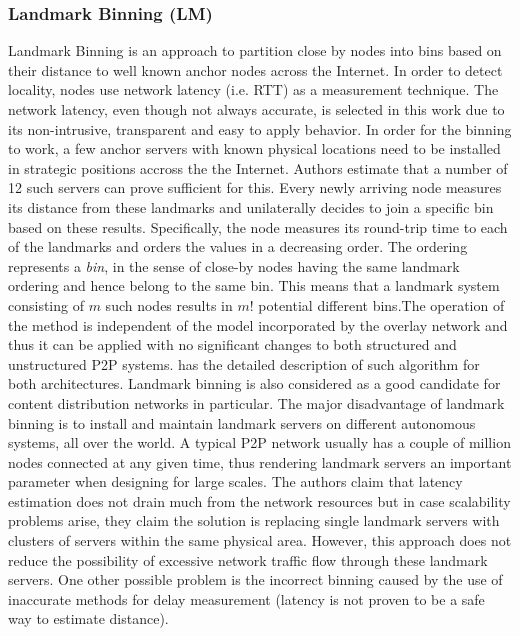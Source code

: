 \subsubsection{Landmark Binning (LM)}\label{sec:landmark_binning}

Landmark Binning \cite{RHMKS2002} is an approach to partition close
by nodes into bins based on their distance to well known anchor nodes across the
Internet.%
In order to detect locality, nodes use network latency (i.e. RTT) as a
measurement technique. The network latency, even though not always accurate, is
selected in this work due to its non-intrusive, transparent and easy to apply
behavior. In order for the binning to work, a few anchor servers with known
physical locations need to be installed in strategic positions accross the the
Internet. Authors estimate that a number of 12 such servers can prove sufficient
for this. Every newly arriving node measures its distance from these landmarks
and unilaterally decides to join a specific bin based on these results.
Specifically, the node measures its round-trip time to each of the landmarks and
orders the values in a decreasing order. The ordering represents a \emph{bin},
in the sense of close-by nodes having the same landmark ordering and hence
belong to the same bin. This means that a landmark system consisting of $m$ such
nodes results in $m!$ potential different bins.The operation of the method is
independent of the model incorporated by the overlay network and thus it can be
applied with no significant changes to both structured and unstructured P2P
systems. \cite{RHMKS2002} has the detailed description of such algorithm for
both architectures. Landmark binning is also considered as a good candidate for
content distribution networks in particular. The major disadvantage of landmark
binning is to install and maintain landmark servers on different autonomous
systems, all over the world. A typical P2P network usually has a couple of
million nodes connected at any given time, thus rendering landmark servers an
important parameter when designing for large scales.  The authors claim that
latency estimation does not drain much from the network resources but in case
scalability problems arise, they claim the solution is replacing single landmark
servers with clusters of servers within the same physical area. However, this
approach does not reduce the possibility of excessive network traffic flow
through these landmark servers. One other possible problem is the incorrect
binning caused by the use of inaccurate methods for delay measurement
(latency is not proven to be a safe way to estimate distance).

